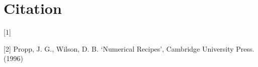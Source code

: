 \documentclass[letterpaper,10pt,english]{sphinxmanual}
\begin{document}
\chapter{Citation}
\label{\detokenize{index:citation}}
{[}1{]} 

{[}2{]} Propp, J. G., Wilson, D. B. ‘Numerical Recipes’, Cambridge University Press. (1996)



\renewcommand{\indexname}{Index}
\printindex
\end{document}
